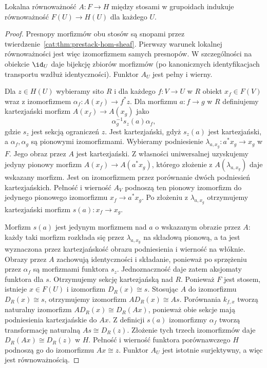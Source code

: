 \begin{twierdzenie}\label{cat:thm:local-equivalence-stacks}
Lokalna równoważność $A:F\to H$ między stosami w grupoidach indukuje równoważność $F(U)\to H(U)$ dla każdego $U$.
\end{twierdzenie}
\begin{proof}
Presnopy morfizmów obu stosów są snopami przez twierdzenie~\ref{cat:thm:prestack-hom-sheaf}. Pierwszy warunek lokalnej równoważności jest więc izomorfizmem samych presnopów. W szczególności na obiekcie $\id_U$ daje bijekcję zbiorów morfizmów (po kanonicznych identyfikacjach transportu wzdłuż identyczności). Funktor $A_U$ jest pełny i wierny.

Dla $z\in H(U)$ wybieramy sito $R$ i dla każdego $f:V\to U$ w $R$ obiekt $x_f\in F(V)$ wraz z izomorfizmem $\alpha_f:A(x_f)\to f^*z$. Dla morfizmu $a:f\to g$ w $R$ definiujemy kartezjański morfizm $A(x_f)\to A(x_g)$ jako
\[
 \alpha_g^{-1}s_z(a)\alpha_f,
\]
gdzie $s_z$ jest sekcją ograniczeń $z$. Jest kartezjański, gdyż $s_z(a)$ jest kartezjański, a $\alpha_f,\alpha_g$ są pionowymi izomorfizmami. Wybieramy podniesienie $\lambda_{a,x_g}:a^*x_g\to x_g$ w $F$. Jego obraz przez $A$ jest kartezjański. Z własności uniwersalnej uzyskujemy jedyny pionowy morfizm $A(x_f)\to A(a^*x_g)$, którego złożenie z $A(\lambda_{a,x_g})$ daje wskazany morfizm. Jest on izomorfizmem przez porównanie dwóch podniesień kartezjańskich. Pełność i wierność $A_V$ podnoszą ten pionowy izomorfizm do jedynego pionowego izomorfizmu $x_f\to a^*x_g$. Po złożeniu z $\lambda_{a,x_g}$ otrzymujemy kartezjański morfizm $s(a):x_f\to x_g$.

Morfizm $s(a)$ jest jedynym morfizmem nad $a$ o wskazanym obrazie przez $A$: każdy taki morfizm rozkłada się przez $\lambda_{a,x_g}$ na składową pionową, a ta jest wyznaczona przez kartezjańskość obrazu podniesienia i wierność na włóknie. Obrazy przez $A$ zachowują identyczności i składanie, ponieważ po sprzężeniu przez $\alpha_f$ są morfizmami funktora $s_z$. Jednoznaczność daje zatem aksjomaty funktora dla $s$. Otrzymujemy sekcję kartezjańską nad $R$. Ponieważ $F$ jest stosem, istnieje $x\in F(U)$ i izomorfizm $D_R(x)\cong s$. Stosując $A$ do izomorfizmu $D_R(x)\cong s$, otrzymujemy izomorfizm $A D_R(x)\cong A s$. Porównania $k_{f,x}$ tworzą naturalny izomorfizm $A D_R(x)\cong D_R(Ax)$, ponieważ obie sekcje mają podniesienia kartezjańskie do $Ax$. Z definicji $s(a)$ izomorfizmy $\alpha_f$ tworzą transformację naturalną $A s\cong D_R(z)$. Złożenie tych trzech izomorfizmów daje $D_R(Ax)\cong D_R(z)$ w $H$. Pełność i wierność funktora porównawczego $H$ podnoszą go do izomorfizmu $Ax\cong z$. Funktor $A_U$ jest istotnie surjektywny, a więc jest równoważnością.
\end{proof}

